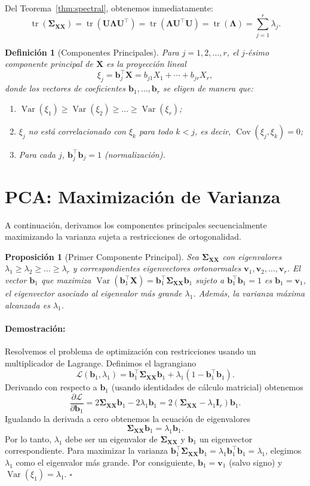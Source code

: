 \documentclass[11pt]{article}
\theoremstyle{plain}
\newtheorem{proposition}[theorem]{Proposición}
\newtheorem{definition}[theorem]{Definición}
\newenvironment{proof}{\paragraph{Demostración:}}{\hfill$\square$}
\newcommand{\X}{\mathbf{X}}
\newcommand{\bff}{\mathbf{b}}
\newcommand{\bfv}{\mathbf{v}}
\newcommand{\bfI}{\mathbf{I}}
\newcommand{\bfU}{\mathbf{U}}
\newcommand{\bfSigma}{\boldsymbol{\Sigma}}
\newcommand{\bfLambda}{\boldsymbol{\Lambda}}
\newcommand{\Var}{\operatorname{Var}}
\newcommand{\Cov}{\operatorname{Cov}}
\newcommand{\tr}{\operatorname{tr}}
\begin{document}
Del Teorema~\ref{thm:spectral}, obtenemos inmediatamente:
\[
\tr(\bfSigma_{\X\X}) = \tr(\bfU \bfLambda \bfU^\top) = \tr(\bfLambda \bfU^\top \bfU) = \tr(\bfLambda) = \sum_{j=1}^r \lambda_j.
\]

\begin{definition}[Componentes Principales]
Para \(j = 1, 2, \dots, r\), el \(j\)-ésimo \textit{componente principal} de \(\X\) es la proyección lineal
\[
\xi_j = \bff_j^\top \X = b_{j1} X_1 + \cdots + b_{jr} X_r,
\]
donde los vectores de coeficientes \(\bff_1, \dots, \bff_r\) se eligen de manera que:
\begin{enumerate}
    \item \(\Var(\xi_1) \ge \Var(\xi_2) \ge \dots \ge \Var(\xi_r)\);
    \item \(\xi_j\) no está correlacionado con \(\xi_k\) para todo \(k < j\), es decir, \(\Cov(\xi_j, \xi_k) = 0\);
    \item Para cada \(j\), \(\bff_j^\top \bff_j = 1\) (normalización).
\end{enumerate}
\end{definition}

\section{PCA: Maximización de Varianza}

A continuación, derivamos los componentes principales secuencialmente maximizando la varianza sujeta a restricciones de ortogonalidad.

\begin{proposition}[Primer Componente Principal]
\label{prop:first}
Sea \(\bfSigma_{\X\X}\) con eigenvalores \(\lambda_1 \ge \lambda_2 \ge \dots \ge \lambda_r\) y correspondientes eigenvectores ortonormales \(\bfv_1, \bfv_2, \dots, \bfv_r\). El vector \(\bff_1\) que maximiza \(\Var(\bff_1^\top \X) = \bff_1^\top \bfSigma_{\X\X} \bff_1\) sujeto a \(\bff_1^\top \bff_1 = 1\) es \(\bff_1 = \bfv_1\), el eigenvector asociado al eigenvalor más grande \(\lambda_1\). Además, la varianza máxima alcanzada es \(\lambda_1\).
\end{proposition}

\begin{proof}
Resolvemos el problema de optimización con restricciones usando un multiplicador de Lagrange. Definimos el lagrangiano
\[
\mathcal{L}(\bff_1, \lambda_1) = \bff_1^\top \bfSigma_{\X\X} \bff_1 + \lambda_1 (1 - \bff_1^\top \bff_1).
\]
Derivando con respecto a \(\bff_1\) (usando identidades de cálculo matricial) obtenemos
\[
\frac{\partial \mathcal{L}}{\partial \bff_1} = 2\bfSigma_{\X\X} \bff_1 - 2\lambda_1 \bff_1 = 2(\bfSigma_{\X\X} - \lambda_1 \bfI_r)\bff_1.
\]
Igualando la derivada a cero obtenemos la ecuación de eigenvalores
\[
\bfSigma_{\X\X} \bff_1 = \lambda_1 \bff_1.
\]
Por lo tanto, \(\lambda_1\) debe ser un eigenvalor de \(\bfSigma_{\X\X}\) y \(\bff_1\) un eigenvector correspondiente. Para maximizar la varianza \(\bff_1^\top \bfSigma_{\X\X} \bff_1 = \lambda_1 \bff_1^\top \bff_1 = \lambda_1\), elegimos \(\lambda_1\) como el eigenvalor más grande. Por consiguiente, \(\bff_1 = \bfv_1\) (salvo signo) y \(\Var(\xi_1) = \lambda_1\).
\end{proof}
\end{document}
